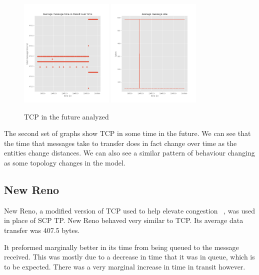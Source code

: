 \documentclass[a4paper,12pt]{article}
\begin{document}
\begin{figure}[h]
  \centering
  \includegraphics[width=0.4\textwidth]{media/tcp_future.png}
  \includegraphics[width=0.4\textwidth]{media/tcp_future_data.png}
  \caption{TCP in the future analyzed}
\end{figure}

The second set of graphs show TCP in some time in the future. We can see that the time that messages
take to transfer does in fact change over time as the entities change distances. We can also see a similar
pattern of behaviour changing as some topology changes in the model. 

\subsection{New Reno}

New Reno, a modified version of TCP used to help elevate congestion ~\cite{Nahar2016}, was used 
in place of SCP TP. New Reno behaved very similar to TCP. Its average data 
transfer was 407.5 bytes. 

It preformed marginally better in its time from being queued to the message received. This 
was mostly due to a decrease in time that it was in queue, which is to be expected. There was 
a very marginal increase in time in transit however. 
\end{document}
